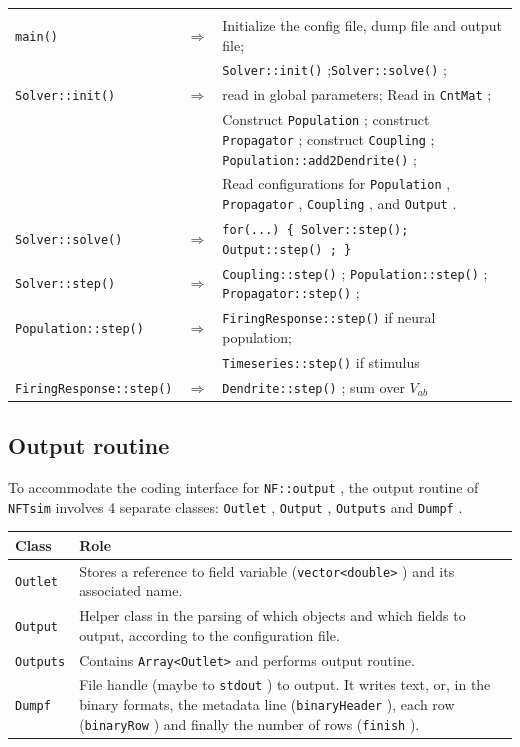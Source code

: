 \documentclass[12pt,a4paper]{article}
\newcommand{\type}[1]{{\small\small\tt #1} }
\newcommand{\NF}[0]{\type{NFTsim}}
\begin{document}
\begin{center}
\begin{tabular}{ | l l p{11cm} | }
\hline \\

\type{main()}& $\Rightarrow$ &Initialize the config file, dump file and output file;\\[6pt]
&&\type{Solver::init()};\type{Solver::solve()};\\[6pt]
\type{Solver::init()}& $\Rightarrow$ &read in global parameters; Read in \type{CntMat};\\[6pt]
&&Construct \type{Population}; construct \type{Propagator}; construct \type{Coupling}; \type{Population::add2Dendrite()};\\[6pt]
&&Read configurations for \type{Population}, \type{Propagator}, \type{Coupling}, and \type{Output}.\\[6pt]
\type{Solver::solve()}& $\Rightarrow$ & \type{for(...) \{ Solver::step(); \type{Output::step()}; \} }\\[6pt]
\type{Solver::step()}& $\Rightarrow$ & \type{Coupling::step()}; \type{Population::step()}; \type{Propagator::step()};\\[6pt]
\type{Population::step()}& $\Rightarrow$ & \type{FiringResponse::step()} if neural population;\\[6pt]
&&\type{Timeseries::step()} if stimulus\\[6pt]
\type{FiringResponse::step()}& $\Rightarrow$ & \type{Dendrite::step()}; sum over \(V_{ab}\)

\\\hline
\end{tabular}
\end{center}

\subsection{Output routine}

To accommodate the coding interface for \type{NF::output}, the output routine of \NF involves 4 separate classes: \type{Outlet}, \type{Output}, \type{Outputs} and \type{Dumpf}.

\begin{tabular}{l p{16cm}}
    Class&Role\\
    \hline
    \type{Outlet}&Stores a reference to field variable (\type{vector<double>}) and its associated name.\\
    \type{Output}&Helper class in the parsing of which objects and which fields to output, according to the configuration file.\\
    \type{Outputs}&Contains \type{Array<Outlet>} and performs output routine.\\
    \type{Dumpf}&File handle (maybe to \type{stdout}) to output. It writes text, or, in the binary formats, the metadata line (\type{binaryHeader}), each row (\type{binaryRow}) and finally the number of rows (\type{finish}).
\end{tabular}
\end{document}
